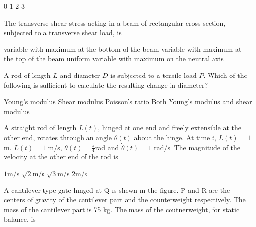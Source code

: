 \documentclass[addpoints,11pt]{exam}
\begin{document}
\begin{questions}
    \begin{oneparchoices}
        \choice $0$
        \choice $1$
        \choice $2$
        \choice $3$
    \end{oneparchoices}

    \question The transverse shear stress acting in a beam of rectangular cross-section, subjected to a transverse shear load, is

    \begin{choices}
        \choice variable with maximum at the bottom of the beam
        \choice variable with maximum at the top of the beam
        \choice uniform
        \choice variable with maximum on the neutral axis
    \end{choices}

    \question A rod of length $L$ and diameter $D$ is subjected to a tensile load $P$. Which of the following is sufficient to calculate the resulting change in diameter?

    \begin{choices}
        \choice Young's modulus
        \choice Shear modulus
        \choice Poisson's ratio
        \choice Both Young's modulus and shear modulus
    \end{choices}

    \question A straight rod of length $L(t)$, hinged at one end and freely extensible at the other end, rotates through an angle $\theta(t)$ about the hinge. At time $t$, $L(t)=1$ m, $\dot{L}(t)=1$ m/s, $\theta(t)=\frac{\pi}{4}$rad and $\dot{\theta}(t)=1$ rad/s. The magnitude of the velocity at the other end of the rod is

    \begin{oneparchoices}
        \choice $1$m/s
        \choice $\sqrt{2}$m/s
        \choice $\sqrt{3}$m/s
        \choice $2$m/s
    \end{oneparchoices}
    \pagebreak

    \question A cantilever type gate hinged at Q is shown in the figure. P and R are the centers of gravity of the cantilever part and the counterweight respectively. The mass of the cantilever part is 75 kg. The mass of the coutnerweight, for static balance, is



\end{questions}
\end{document}
